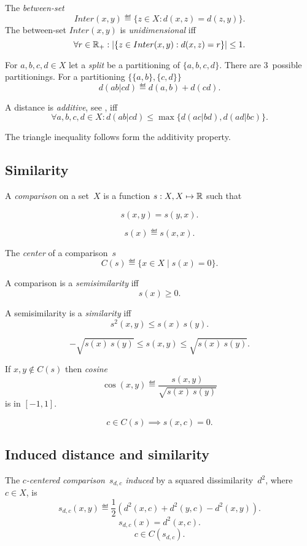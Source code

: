 \documentclass[10pt,a4paper]{article}
\theoremstyle{plain} \newtheorem{Lem}{Lemma}
\begin{document}
The {\em between-set}
$$ Inter(x,y) \eqdef \{z \in X: d(x,z) = d(z,y)\}. $$
The between-set $Inter(x,y)$ is {\em unidimensional} iff 
$$ \forall r \in \mathbb R_+ : |\{z \in Inter(x,y): d(x,z) = r\}| \le 1. $$

For $a,b,c,d \in X$ let a {\em split} be a partitioning of $\{a,b,c,d\}$.
There are 3~possible partitionings.
For a partitioning $\{\{a,b\},\{c,d\}\}$
$$ d(ab|cd) \eqdef d(a,b) + d(cd). $$

A distance is {\em additive}, see \cite{Buneman}, iff
\begin{equation} \tag{additivity}
\forall a,b,c,d \in X : d(ab|cd) \le \max \{d(ac|bd), d(ad|bc)\}. 
\end{equation}

The triangle inequality follows form the additivity property.


\subsection{Similarity}

A {\em comparison} on a set~$X$ is a function $s:X,X \mapsto \mathbb R$ such that

$$ s(x,y) = s(y,x). $$

$$ s(x) \eqdef s(x,x). $$

The {\em center} of a comparison~$s$
$$ C(s) \eqdef \{x \in X \mid s(x) = 0\}. $$

A comparison is a {\em semisimilarity} iff
$$ s(x) \ge 0. $$

A semisimilarity is a {\em similarity} iff 
\begin{equation} \tag{H\"older's inequality} 
  s^2(x,y) \le s(x) \ s(y) .
\end{equation}

$$ - \sqrt {s(x) \ s(y)} \le s(x,y) \le \sqrt {s(x) \ s(y)}. $$

If $x, y \not \in C(s)$ then {\em cosine} 
$$ \cos(x,y) \eqdef \frac {s(x,y)} {\sqrt{s(x) \ s(y)}} $$
is in $[-1,1]$.

$$ c \in C(s) \implies s(x,c) = 0. $$


\subsection{Induced distance and similarity}

The {\em $c$-centered comparison~$s_{d,c}$ induced} by a squared dissimilarity~$d^2$, where $c \in X$, is
$$ s_{d,c}(x,y) \eqdef \frac 1 2 \left(d^2(x,c) + d^2(y,c) - d^2(x,y) \right). $$
$$ s_{d,c}(x) = d^2(x,c). $$
$$ c \in C(s_{d,c}). $$
\end{document}
